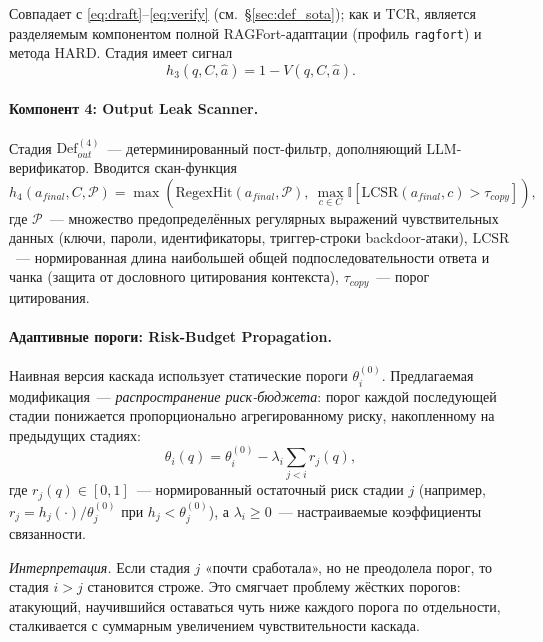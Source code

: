 \documentclass[12pt, a4paper]{article}
\theoremstyle{definition}
\theoremstyle{remark}
\begin{document}
Совпадает с \eqref{eq:draft}--\eqref{eq:verify} (см.~\S\ref{sec:def_sota}); как и TCR, является разделяемым компонентом полной RAGFort-адаптации (профиль \texttt{ragfort}) и метода HARD. Стадия имеет сигнал
\begin{equation}
    h_3(q, C, \hat{a}) = 1 - V(q, C, \hat{a}).
\end{equation}

\paragraph{Компонент 4: Output Leak Scanner.}

Стадия $\mathrm{Def}_{out}^{(4)}$~--- детерминированный пост-фильтр, дополняющий LLM-верификатор. Вводится скан-функция
\begin{equation}
    \label{eq:leak_scan}
    h_4(a_{final}, C, \mathcal{P}) = \max\!\left(
      \mathrm{RegexHit}(a_{final}, \mathcal{P}),\
      \max_{c \in C} \mathbb{I}\!\left[\mathrm{LCSR}(a_{final}, c) > \tau_{copy}\right]
    \right),
\end{equation}
где $\mathcal{P}$~--- множество предопределённых регулярных выражений чувствительных данных (ключи, пароли, идентификаторы, триггер-строки backdoor-атаки), $\mathrm{LCSR}$~--- нормированная длина наибольшей общей подпоследовательности ответа и чанка (защита от дословного цитирования контекста), $\tau_{copy}$~--- порог цитирования.

\paragraph{Адаптивные пороги: Risk-Budget Propagation.}

Наивная версия каскада использует статические пороги $\theta_i^{(0)}$. Предлагаемая модификация~--- \textit{распространение риск-бюджета}: порог каждой последующей стадии понижается пропорционально агрегированному риску, накопленному на предыдущих стадиях:
\begin{equation}
    \label{eq:risk_budget}
    \theta_i(q) = \theta_i^{(0)} - \lambda_i \sum_{j < i} r_j(q),
\end{equation}
где $r_j(q) \in [0, 1]$~--- нормированный остаточный риск стадии $j$ (например, $r_j = h_j(\cdot) / \theta_j^{(0)}$ при $h_j < \theta_j^{(0)}$), а $\lambda_i \ge 0$~--- настраиваемые коэффициенты связанности.

\textit{Интерпретация.} Если стадия $j$ «почти сработала», но не преодолела порог, то стадия $i > j$ становится строже. Это смягчает проблему жёстких порогов: атакующий, научившийся оставаться чуть ниже каждого порога по отдельности, сталкивается с суммарным увеличением чувствительности каскада.
\end{document}
